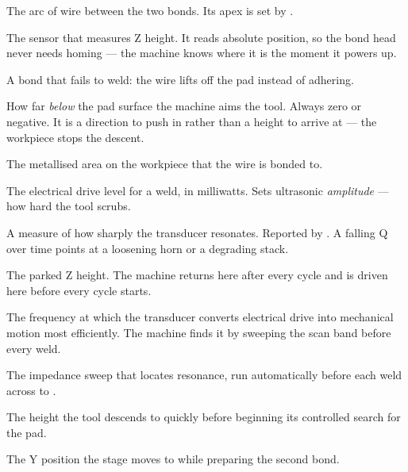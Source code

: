 \begin{description}[leftmargin=!,labelwidth=32mm,style=nextline,font=\normalfont\bfseries]
\item[Loop] The arc of wire between the two bonds. Its apex is set by
  .

\item[LVDT] The sensor that measures Z height. It reads absolute position, so
  the bond head never needs homing --- the machine knows where it is the
  moment it powers up.

\item[Non-stick] A bond that fails to weld: the wire lifts off the pad instead
  of adhering.

\item[Overtravel] How far \emph{below} the pad surface the machine aims the
  tool. Always zero or negative. It is a direction to push in rather than a
  height to arrive at --- the workpiece stops the descent.

\item[Pad] The metallised area on the workpiece that the wire is bonded to.

\item[Power] The electrical drive level for a weld, in milliwatts. Sets
  ultrasonic \emph{amplitude} --- how hard the tool scrubs.

\item[Q (quality factor)] A measure of how sharply the transducer resonates.
  Reported by . A falling Q over time points at a loosening horn
  or a degrading stack.

\item[Reset height] The parked Z height. The machine returns here after every
  cycle and is driven here before every cycle starts.

\item[Resonance] The frequency at which the transducer converts electrical
  drive into mechanical motion most efficiently. The machine finds it by
  sweeping the scan band before every weld.

\item[Scan] The impedance sweep that locates resonance, run automatically
  before each weld across  to .

\item[Search height] The height the tool descends to quickly before beginning
  its controlled search for the pad.

\item[Stepback] The Y position the stage moves to while preparing the second
  bond.


\end{description}
